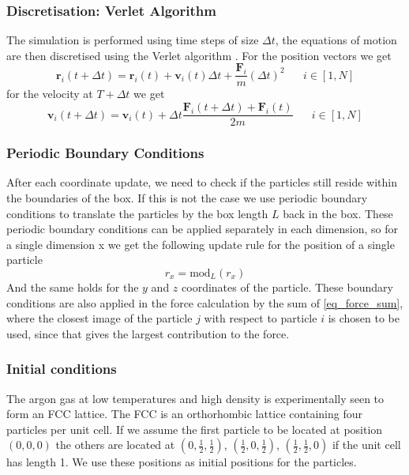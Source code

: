 \documentclass[twoside]{article}
\begin{document}
\subsubsection*{Discretisation: Verlet Algorithm}

The simulation is performed using time steps of size $\Delta t$, the equations of motion are then discretised using the Verlet algorithm \cite{ref_verlet}. For the position vectors we get
\begin{equation}\label{eq_verlet_pos}
\mathbf{r}_i(t+\Delta t) = \mathbf{r}_i(t) + \mathbf{v}_i(t)\Delta t + \frac{\mathbf{F}_i}{m}(\Delta t) ^2  \hspace{20pt} i\in [1, N]
\end{equation}
for the velocity at $T+\Delta t$ we get
\begin{equation}\label{eq_verlet_vel}
\mathbf{v}_i(t+\Delta t) = \mathbf{v}_i(t) + \Delta t \frac{\mathbf{F}_i(t + \Delta t) + \mathbf{F}_i(t)}{2m}  \hspace{20pt} i\in [1, N]
\end{equation}

\subsubsection*{Periodic Boundary Conditions}
After each coordinate update, we need to check if the particles still reside within the boundaries of the box. If this is not the case we use periodic boundary conditions to translate the particles by the box length $L$ back in the box. These periodic boundary conditions can be applied separately in each dimension, so for a single dimension x we get the following update rule for the position of a single particle
\begin{equation}\label{eq_pbc}
r_x = \text{mod}_L(r_x)
\end{equation}
And the same holds for the $y$ and $z$ coordinates of the particle. These boundary conditions are also applied in the force calculation by the sum of \eqref{eq_force_sum}, where the closest image of the particle $j$ with respect to particle $i$ is chosen to be used, since that gives the largest contribution to the force. 


\subsubsection*{Initial conditions}
The argon gas at low temperatures and high density is experimentally seen to form an FCC lattice. The FCC is an orthorhombic lattice containing four particles per unit cell. If we assume the first particle to be located at position $(0,0,0)$ the others are located at $(0,\frac{1}{2},\frac{1}{2})$, $(\frac{1}{2},0,\frac{1}{2})$, $(\frac{1}{2},\frac{1}{2},0)$ if the unit cell has length 1. We use these positions as initial positions for the particles.
\end{document}
